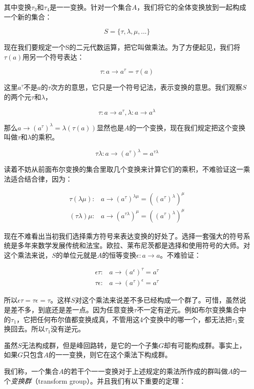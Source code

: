 \documentclass{article}
\begin{document}
其中变换$\tau_3$和$\tau_4$是一一变换。针对一个集合$A$，我们将它的全体变换放到一起构成一个新的集合：

\[
S = \{\tau, \lambda, \mu, ...\}
\]

现在我们要规定一个S的二元代数运算，把它叫做乘法。为了方便起见，我们将$\tau(a)$用另一个符号表达：

\[
\tau: a \to a^\tau = \tau(a)
\]

这里$a^\tau$不是$a$的$\tau$次方的意思，它只是一个符号记法，表示变换的意思。我们观察$S$的两个元$\tau$和$\lambda$，

\[
\tau: a \to a^\tau,  \lambda: a \to a^\lambda
\]

那么$a \to (a^\tau)^\lambda = \lambda(\tau(a))$显然也是$A$的一个变换，现在我们规定把这个变换叫做$\tau$和$\lambda$的乘积。

\[
\tau\lambda: a \to (a^\tau)^\lambda = a^{\tau\lambda}
\]

读着不妨从前面布尔变换的集合里取几个变换来计算它们的乘积，不难验证这一乘法适合结合律，因为：

\[
\begin{array}{rl}
\tau(\lambda\mu): & a \to (a^\tau)^{\lambda\mu} = ((a^\tau)^\lambda)^\mu \\
(\tau\lambda)\mu: & a \to (a^{\tau\lambda})^\mu = ((a^\tau)^\lambda)^\mu
\end{array}
\]

现在不难看出当初我们选择乘方符号来表达变换的好处了。选择一套强大的符号系统是多年来数学发展传统和法宝。欧拉、莱布尼茨都是选择和使用符号的大师。对这个乘法来说，$S$的单位元就是$A$的恒等变换$\epsilon: a \to a$。不难验证：

\[
\begin{array}{rl}
\epsilon\tau: & a \to (a^\epsilon)^\tau = a^\tau \\
\tau\epsilon: & a \to (a^\tau)^\epsilon = a^\tau
\end{array}
\]

所以$\epsilon\tau = \tau\epsilon = \tau$。这样$S$对这个乘法来说差不多已经构成一个群了。可惜，虽然说是差不多，到底还是差一点。因为任意变换$\tau$不一定有逆元。例如布尔变换集合中的$\tau_1$，它把任何布尔值都变换成真，不管用这4个变换中的哪一个，都无法把$\tau_1$变换回去。所以$\tau_1$没有逆元。

虽然$S$无法构成群，但是峰回路转，是它的一个子集$G$却有可能构成群。事实上，如果$G$只包含$A$的一一变换，则它在这个乘法下构成群。

我们称，一个集合$A$的若干个一一变换对于上述规定的乘法所作成的群叫做$A$的一个{\em 变换群}（transform group）。并且我们有以下重要的定理：
\end{document}
